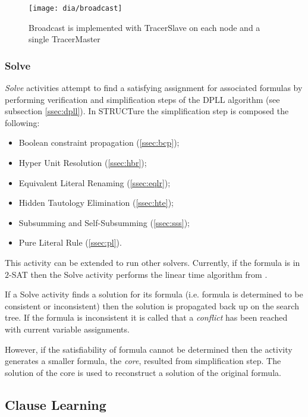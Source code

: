 \begin{figure}[h]
  \centering
  \texttt{[image: dia/broadcast]}
  \caption{Broadcast is implemented with
  TracerSlave on each node and a single TracerMaster}
  \label{fig:broadcast}
\end{figure}


\subsubsection{Solve}
\label{sssec:solve}

\emph{Solve} activities attempt to find a satisfying assignment for
associated formulas by performing verification and simplification
steps of the DPLL algorithm (see subsection \ref{ssec:dpll}).
In STRUCTure the simplification step is composed the following:
\begin{itemize}
  \item Boolean constraint propagation (\ref{ssec:bcp});
  \item Hyper Unit Resolution (\ref{ssec:hbr});
  \item Equivalent Literal Renaming (\ref{ssec:eqlr});
  \item Hidden Tautology Elimination (\ref{ssec:hte});
  \item Subsumming and Self-Subsumming (\ref{ssec:sss});
  \item Pure Literal Rule (\ref{ssec:pl}).
\end{itemize}

This activity can be extended to run other solvers. Currently,
if the formula is in $2$-SAT then the Solve activity performs the
linear time algorithm from \cite{mine:tarjan}.

If a Solve activity finds a solution for its formula (i.e.
formula is determined to be consistent or inconsistent) then the
solution is propagated back up on the search tree. If the formula
is inconsistent it is called that a \emph{conflict} has been reached
with current variable assignments.

However, if the satisfiability of formula cannot be determined
then the activity generates a smaller formula, the \emph{core},
resulted from simplification step. The solution of the core is used
to reconstruct a solution of the original formula.


\subsection{Clause Learning}
\label{ssec:learning}


